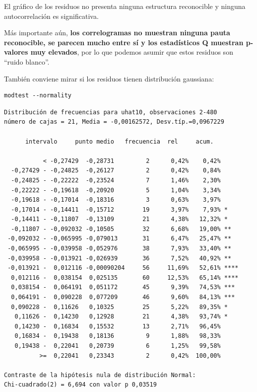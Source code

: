 \documentclass[10pt]{article}
\begin{document}
El gráfico de los residuos no presenta ninguna estructura reconocible y ninguna autocorrelación es significativa. 

Más importante aún, \textbf{los correlogramas no muestran ninguna pauta
reconocible, se parecen mucho entre sí y los estadísticos Q muestran
p-valores muy elevados}, por lo que podemos asumir que estos residuos
son ``ruido blanco''.
\medskip

También conviene mirar si los residuos tienen distribución gaussiana:
\medskip

\begin{verbatim}
modtest --normality
\end{verbatim}

\begin{verbatim}
Distribución de frecuencias para uhat10, observaciones 2-480
número de cajas = 21, Media = -0,00162572, Desv.típ.=0,0967229

      intervalo     punto medio   frecuencia  rel     acum.

           < -0,27429  -0,28731         2      0,42%    0,42% 
  -0,27429 - -0,24825  -0,26127         2      0,42%    0,84% 
  -0,24825 - -0,22222  -0,23524         7      1,46%    2,30% 
  -0,22222 - -0,19618  -0,20920         5      1,04%    3,34% 
  -0,19618 - -0,17014  -0,18316         3      0,63%    3,97% 
  -0,17014 - -0,14411  -0,15712        19      3,97%    7,93% *
  -0,14411 - -0,11807  -0,13109        21      4,38%   12,32% *
  -0,11807 - -0,092032 -0,10505        32      6,68%   19,00% **
 -0,092032 - -0,065995 -0,079013       31      6,47%   25,47% **
 -0,065995 - -0,039958 -0,052976       38      7,93%   33,40% **
 -0,039958 - -0,013921 -0,026939       36      7,52%   40,92% **
 -0,013921 -  0,012116 -0,00090204     56     11,69%   52,61% ****
  0,012116 -  0,038154  0,025135       60     12,53%   65,14% ****
  0,038154 -  0,064191  0,051172       45      9,39%   74,53% ***
  0,064191 -  0,090228  0,077209       46      9,60%   84,13% ***
  0,090228 -  0,11626   0,10325        25      5,22%   89,35% *
   0,11626 -  0,14230   0,12928        21      4,38%   93,74% *
   0,14230 -  0,16834   0,15532        13      2,71%   96,45% 
   0,16834 -  0,19438   0,18136         9      1,88%   98,33% 
   0,19438 -  0,22041   0,20739         6      1,25%   99,58% 
          >=  0,22041   0,23343         2      0,42%  100,00% 

Contraste de la hipótesis nula de distribución Normal:
Chi-cuadrado(2) = 6,694 con valor p 0,03519
\end{verbatim}
\end{document}
